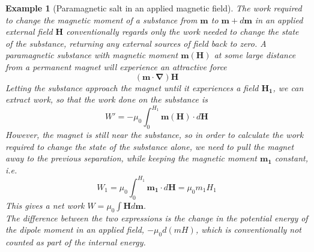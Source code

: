 \documentclass[a4paper]{article}
\newtheorem{eg}{Example}[section]
\theoremstyle{new}
\begin{document}
\begin{eg}[Paramagnetic salt in an applied magnetic field]
The work required to change the magnetic moment of a substance from $\mathbf{m}$ to $\mathbf{m}+d\mathbf{m}$ in an applied external field $\mathbf{H}$ conventionally regards only the work needed to change the state of the substance, returning any external sources of field back to zero. A paramagnetic substance with magnetic moment $\mathbf{m}(\mathbf{H})$ at some large distance from a permanent magnet will experience an attractive force
$$(\mathbf{m}\cdot\boldsymbol{\nabla})\mathbf{H}$$
Letting the substance approach the magnet until it experiences a field $\mathbf{H_1}$, we can extract work, so that the work done on the substance is
$$W'=-\mu_0\int_0^{H_1}\mathbf{m}(\mathbf{H})\cdot d\mathbf{H}$$
However, the magnet is still near the substance, so in order to calculate the work required to change the state of the substance alone, we need to pull the magnet away to the previous separation, while keeping the magnetic moment $\mathbf{m_1}$ constant, i.e.
$$W_1=\mu_0\int_0^{H_1}\mathbf{m_1}\cdot d\mathbf{H}=\mu_0m_1H_1$$
This gives a net work $W=\mu_0\int\mathbf{H} d\mathbf{m}$.\\[5pt]
The difference between the two expressions is the change in the potential energy of the dipole moment in an applied field, $-\mu_0d(mH)$, which is conventionally not counted as part of the internal energy. 
\end{eg}
\newpage
\end{document}
